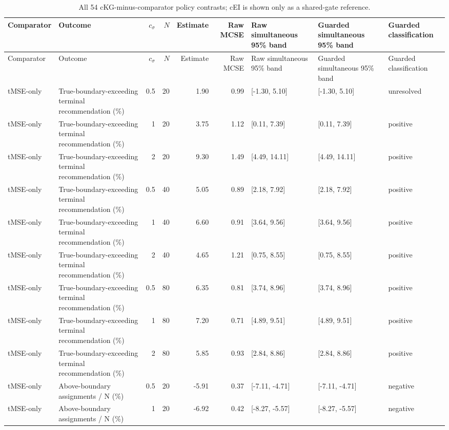\begin{longtable}{p{1.8cm}p{3.0cm}rrrrp{2.6cm}p{2.6cm}p{1.6cm}}
\caption{All 54 cKG-minus-comparator policy contrasts; cEI is shown only as a shared-gate reference.}\label{tab:budget-toxicity-calibration-family-a}\\
\toprule
Comparator & Outcome & $c_\sigma$ & $N$ & Estimate & Raw MCSE & Raw simultaneous 95\% band & Guarded simultaneous 95\% band & Guarded classification \\
\midrule
\endfirsthead
\toprule
Comparator & Outcome & $c_\sigma$ & $N$ & Estimate & Raw MCSE & Raw simultaneous 95\% band & Guarded simultaneous 95\% band & Guarded classification \\
\midrule
\endhead
tMSE-only & True-boundary-exceeding terminal recommendation (\%) & 0.5 & 20 & 1.90 & 0.99 & [-1.30, 5.10] & [-1.30, 5.10] & unresolved \\
tMSE-only & True-boundary-exceeding terminal recommendation (\%) & 1 & 20 & 3.75 & 1.12 & [0.11, 7.39] & [0.11, 7.39] & positive \\
tMSE-only & True-boundary-exceeding terminal recommendation (\%) & 2 & 20 & 9.30 & 1.49 & [4.49, 14.11] & [4.49, 14.11] & positive \\
tMSE-only & True-boundary-exceeding terminal recommendation (\%) & 0.5 & 40 & 5.05 & 0.89 & [2.18, 7.92] & [2.18, 7.92] & positive \\
tMSE-only & True-boundary-exceeding terminal recommendation (\%) & 1 & 40 & 6.60 & 0.91 & [3.64, 9.56] & [3.64, 9.56] & positive \\
tMSE-only & True-boundary-exceeding terminal recommendation (\%) & 2 & 40 & 4.65 & 1.21 & [0.75, 8.55] & [0.75, 8.55] & positive \\
tMSE-only & True-boundary-exceeding terminal recommendation (\%) & 0.5 & 80 & 6.35 & 0.81 & [3.74, 8.96] & [3.74, 8.96] & positive \\
tMSE-only & True-boundary-exceeding terminal recommendation (\%) & 1 & 80 & 7.20 & 0.71 & [4.89, 9.51] & [4.89, 9.51] & positive \\
tMSE-only & True-boundary-exceeding terminal recommendation (\%) & 2 & 80 & 5.85 & 0.93 & [2.84, 8.86] & [2.84, 8.86] & positive \\
tMSE-only & Above-boundary assignments / N (\%) & 0.5 & 20 & -5.91 & 0.37 & [-7.11, -4.71] & [-7.11, -4.71] & negative \\
tMSE-only & Above-boundary assignments / N (\%) & 1 & 20 & -6.92 & 0.42 & [-8.27, -5.57] & [-8.27, -5.57] & negative \\

\end{longtable}
